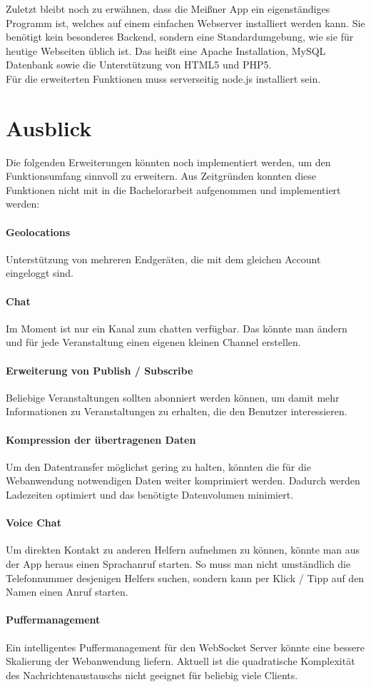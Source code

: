 Zuletzt bleibt noch zu erwähnen, dass die Meißner App ein eigenständiges Programm ist, welches auf einem einfachen Webserver installiert werden kann. Sie benötigt kein besonderes Backend, sondern eine Standardumgebung, wie sie für heutige Webseiten üblich ist. Das heißt eine Apache Installation, MySQL Datenbank sowie die Unterstützung von HTML5 und PHP5.\\
Für die erweiterten Funktionen muss serverseitig node.js installiert sein.



\section{Ausblick}
Die folgenden Erweiterungen könnten noch implementiert werden, um den Funktionsumfang sinnvoll zu erweitern. Aus Zeitgründen konnten diese Funktionen nicht mit in die Bachelorarbeit aufgenommen und implementiert werden:

\paragraph{Geolocations}
Unterstützung von mehreren Endgeräten, die mit dem gleichen Account eingeloggt sind.

\paragraph{Chat}
Im Moment ist nur ein Kanal zum chatten verfügbar. Das könnte man ändern und für jede Veranstaltung einen eigenen kleinen Channel erstellen.

\paragraph{Erweiterung von Publish / Subscribe}
Beliebige Veranstaltungen sollten abonniert werden können, um damit mehr Informationen zu Veranstaltungen zu erhalten, die den Benutzer interessieren.

\paragraph{Kompression der übertragenen Daten}
Um den Datentransfer möglichst gering zu halten, könnten die für die Webanwendung notwendigen Daten weiter komprimiert werden. Dadurch werden Ladezeiten optimiert und das benötigte Datenvolumen minimiert.

\paragraph{Voice Chat}
Um direkten Kontakt zu anderen Helfern aufnehmen zu können, könnte man aus der App heraus einen Sprachanruf starten. So muss man nicht umständlich die Telefonnummer desjenigen Helfers suchen, sondern kann per Klick / Tipp auf den Namen einen Anruf starten.

\paragraph{Puffermanagement}
Ein intelligentes Puffermanagement für den WebSocket Server könnte eine bessere Skalierung der Webanwendung liefern. Aktuell ist die quadratische Komplexität des Nachrichtenaustauschs nicht geeignet für beliebig viele Clients.



